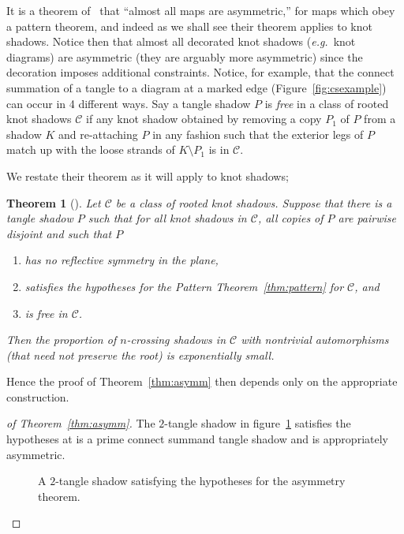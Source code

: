 \documentclass[submission%
]{dmtcs}
\newtheorem*{untheorem}{Theorem}
\begin{document}
It is a theorem of~\cite{Richmond19951} that ``almost all maps are
asymmetric,'' for maps which obey a pattern theorem, and indeed as we
shall see their theorem applies to knot shadows. Notice then that
almost all decorated knot shadows (\textit{e.g.}\ knot diagrams) are
asymmetric (they are arguably more asymmetric) since the decoration
imposes additional constraints. Notice, for example, that the connect
summation of a tangle to a diagram at a marked edge
(Figure~\ref{fig:csexample}) can occur in 4 different ways. Say a
tangle shadow $P$ is \emph{free} in a class of rooted knot shadows
$\mathscr{C}$ if any knot shadow obtained by removing a copy $P_1$ of
$P$ from a shadow $K$ and re-attaching $P$ in any fashion such that
the exterior legs of $P$ match up with the loose strands of $K
\setminus P_1$ is in $\mathscr{C}$.

We restate their theorem as it will apply to knot shadows;

\begin{untheorem}[\cite{Richmond19951}]
  Let $\mathscr{C}$ be a class of rooted knot shadows. Suppose that
  there is a tangle shadow $P$ such that for all knot shadows in
  $\mathscr{C}$, all copies of $P$ are pairwise disjoint and such that $P$
  \begin{enumerate}
  \item has no reflective symmetry in the plane,
  \item satisfies the hypotheses for the Pattern
    Theorem~\ref{thm:pattern} for $\mathscr{C}$, and
  \item is free in $\mathscr{C}$.
  \end{enumerate}
  Then the proportion of $n$-crossing shadows in $\mathscr{C}$ with
  nontrivial automorphisms (that need not preserve the root) is
  exponentially small.
\end{untheorem}

Hence the proof of Theorem~\ref{thm:asymm} then depends only on the
appropriate construction.

\begin{proof}[of Theorem~\ref{thm:asymm}] The $2$-tangle shadow in
  figure~\ref{fig:asymtangle} satisfies the hypotheses at is a prime
  connect summand tangle shadow and is appropriately asymmetric.
  \begin{figure}[htbp]
    \centering
    
    \caption{A $2$-tangle shadow satisfying the hypotheses for the
      asymmetry theorem.}
    \label{fig:asymtangle}
  \end{figure}
\end{proof}
\end{document}
